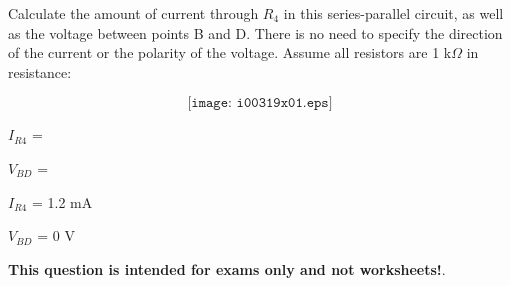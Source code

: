 

Calculate the amount of current through $R_4$ in this series-parallel circuit, as well as the voltage between points B and D.  There is no need to specify the direction of the current or the polarity of the voltage.  Assume all resistors are 1 k$\Omega$ in resistance:

$$\texttt{[image: i00319x01.eps]}$$

$I_{R4}$ = 

\vskip 10pt

$V_{BD}$ = 

\vskip 10pt







$I_{R4}$ = 1.2 mA

\vskip 10pt

$V_{BD}$ = 0 V







{\bf This question is intended for exams only and not worksheets!}.



